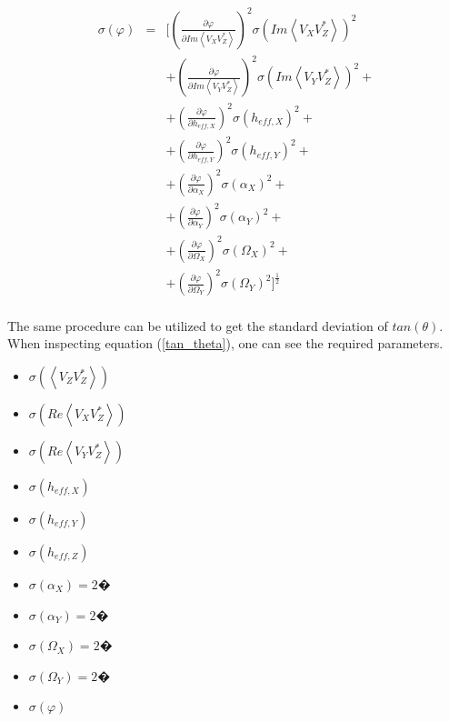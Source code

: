 \documentclass[a4paper,10pt]{thesis}
\begin{document}
\begin{eqnarray}
\sigma (\varphi) &=&  [(\frac{\partial \varphi}{\partial Im \left\langle V_X V_Z^{*}\right\rangle})^2 \sigma (Im \left\langle V_X V_Z^{*}\right\rangle)^2\\
&&+ (\frac{\partial \varphi}{\partial Im \left\langle V_Y V_Z^{*}\right\rangle})^2 \sigma (Im \left\langle V_Y V_Z^{*}\right\rangle)^2 +\nonumber \\
&&+ (\frac{\partial \varphi}{\partial h_{eff,X}})^2 \sigma (h_{eff,X})^2 +\nonumber \\
&&+ (\frac{\partial \varphi}{\partial h_{eff,Y}})^2 \sigma (h_{eff,Y})^2 +\nonumber \\
&&+ (\frac{\partial \varphi}{\partial \alpha_X})^2 \sigma (\alpha_X)^2 +\nonumber \\
&&+ (\frac{\partial \varphi}{\partial \alpha_Y})^2 \sigma (\alpha_Y)^2 +\nonumber \\
&&+ (\frac{\partial \varphi}{\partial \Omega_X})^2 \sigma (\Omega_X)^2 +\nonumber \\
&&+ (\frac{\partial \varphi}{\partial \Omega_Y})^2 \sigma (\Omega_Y)^2]^\frac{1}{2} \nonumber
\end{eqnarray}

\paragraph*{}
The same procedure can be utilized to get the standard deviation of $tan(\theta)$. When inspecting equation (\ref{tan_theta}), one can see the required parameters.

\begin{itemize}
\item $\sigma (\left\langle V_Z V_Z^{*}\right\rangle)$
\item $\sigma (Re \left\langle V_X V_Z^{*}\right\rangle)$
\item $\sigma (Re \left\langle V_Y V_Z^{*}\right\rangle)$
\item $\sigma (h_{eff,X})$
\item $\sigma (h_{eff,Y})$
\item $\sigma (h_{eff,Z})$
\item $\sigma (\alpha_X)=2�$
\item $\sigma (\alpha_Y)=2�$
\item $\sigma (\Omega_X)=2�$
\item $\sigma (\Omega_Y)=2�$
\item $\sigma (\varphi)$
\end{itemize}
\end{document}
